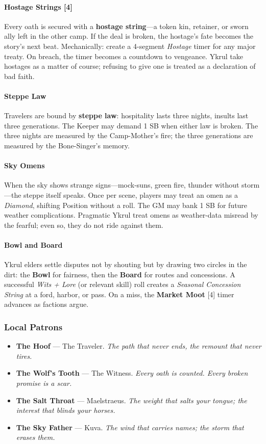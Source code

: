 \paragraph{Hostage Strings [4]}
Every oath is secured with a \textbf{hostage string}---a token kin, retainer, or sworn ally left in the other camp. If the deal is broken, the hostage's fate becomes the story's next beat. Mechanically: create a 4-segment \emph{Hostage} timer for any major treaty. On breach, the timer becomes a countdown to vengeance. Ykrul take hostages as a matter of course; refusing to give one is treated as a declaration of bad faith.

\paragraph{Steppe Law}
Travelers are bound by \textbf{steppe law}: hospitality lasts three nights, insults last three generations. The Keeper may demand 1 SB when either law is broken. The three nights are measured by the Camp-Mother's fire; the three generations are measured by the Bone-Singer's memory.

\paragraph{Sky Omens}
When the sky shows strange signs---mock-suns, green fire, thunder without storm---the steppe itself speaks. Once per scene, players may treat an omen as a \emph{Diamond}, shifting Position without a roll. The GM may bank 1 SB for future weather complications. Pragmatic Ykrul treat omens as weather-data misread by the fearful; even so, they do not ride against them.

\paragraph{Bowl and Board}
Ykrul elders settle disputes not by shouting but by drawing two circles in the dirt: the \textbf{Bowl} for fairness, then the \textbf{Board} for routes and concessions. A successful \emph{Wits + Lore} (or relevant skill) roll creates a \emph{Seasonal Concession String} at a ford, harbor, or pass. On a miss, the \textbf{Market Moot} [4] timer advances as factions argue.

\subsubsection{Local Patrons}

\begin{itemize}[nosep]
  \item \textbf{The Hoof} --- The Traveler. \textit{The path that never ends, the remount that never tires.}
  \item \textbf{The Wolf's Tooth} --- The Witness. \textit{Every oath is counted. Every broken promise is a scar.}
  \item \textbf{The Salt Throat} --- Maelstraeus. \textit{The weight that salts your tongue; the interest that blinds your horses.}
  \item \textbf{The Sky Father} --- Kuva. \textit{The wind that carries names; the storm that erases them.}
\end{itemize}

